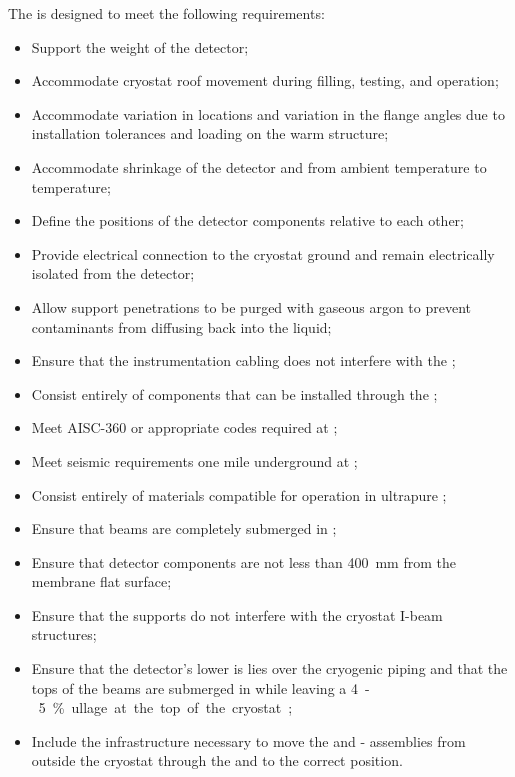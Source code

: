 The  is designed to meet the following  requirements:
\begin{itemize}
 \setlength\itemsep{1mm}
\setlength{\parsep}{1mm}
\setlength{\itemsep}{-5mm}
\item Support the weight of the detector;
\item Accommodate cryostat roof movement during filling, testing, and operation;
\item Accommodate variation in \fdth locations and
  variation in the flange angles due to installation tolerances and
  loading on the warm structure;
\item Accommodate shrinkage of the detector and  from ambient
  temperature to  temperature;
\item Define the positions of the detector components relative to each other; 
\item Provide electrical connection to the cryostat ground and remain electrically isolated from the detector;
\item Allow support penetrations to be purged with gaseous argon to prevent contaminants from diffusing back into the liquid; 
\item Ensure that the instrumentation cabling does not interfere with the ;
\item Consist entirely of components that can  
be installed through the ;
\item %
Meet AISC-360 or appropriate codes required at ;
\item %
Meet seismic requirements one mile underground at ;
\item Consist entirely of %
materials compatible for operation in ultrapure ;
\item Ensure that beams are completely submerged in ;
\item Ensure that detector components are not less than \SI{400}{mm} from the membrane flat surface;
\item Ensure that the supports do not interfere with the cryostat I-beam structures;
\item Ensure %
that the detector's lower  is lies over the cryogenic piping and that the tops of the  beams are submerged in  while leaving a \SI{4}-\SI{5}{\%} ullage at the top of the cryostat;
\item Include the infrastructure necessary to move the  and
  - assemblies from outside the cryostat through the
   and to the correct position.
\end{itemize}

